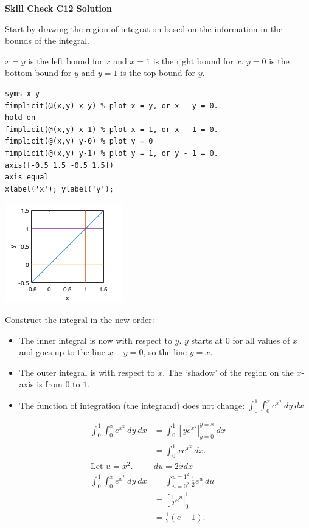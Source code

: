 \documentclass[12pt,letterpaper,noanswers]{exam}
\begin{document}
\noindent\textbf{Skill Check C12 Solution}

Start by drawing the region of integration based on the information in the bounds of the integral.

$x=y$ is the left bound for $x$ and $x=1$ is the right bound for $x$.  $y = 0$ is the bottom bound for $y$ and $y = 1$ is the top bound for $y$.

\begin{lstlisting}
syms x y
fimplicit(@(x,y) x-y) % plot x = y, or x - y = 0.
hold on
fimplicit(@(x,y) x-1) % plot x = 1, or x - 1 = 0.
fimplicit(@(x,y) y-0) % plot y = 0
fimplicit(@(x,y) y-1) % plot y = 1, or y - 1 = 0.
axis([-0.5 1.5 -0.5 1.5])
axis equal
xlabel('x'); ylabel('y');
\end{lstlisting}

\includegraphics{img/C12-2dregion.png}

Construct the integral in the new order:
\begin{itemize}
\itemsep0em
    \item The inner integral is now with respect to $y$.  $y$ starts at $0$ for all values of $x$ and goes up to the line $x - y = 0$, so the line $y = x$.  
    \item The outer integral is with respect to $x$.  The `shadow' of the region on the $x$-axis is from $0$ to $1$.
    \item The function of integration (the integrand) does not change: $\displaystyle\int_0^1\int_0^x e^{x^2}\ dy\ dx$
\end{itemize}
\begin{align*}
    \int_0^1\int_0^x e^{x^2}\ dy\ dx &= \int_0^1\left[y e^{x^2}\right\vert_{y=0}^{y=x}\ dx \\
    &= \int_0^1 x e^{x^2}\ dx. \\
    \text{Let }u=x^2. & du = 2xdx\\
    \int_0^1\int_0^x e^{x^2}\ dy\ dx &= \int_{u=0^2}^{u=1^2} \frac{1}{2}e^u \ du \\
    &= \left[ \frac{1}{2}e^u\right\vert_0^1 \\
    &= \frac{1}{2}(e - 1).
\end{align*}
\end{document}
